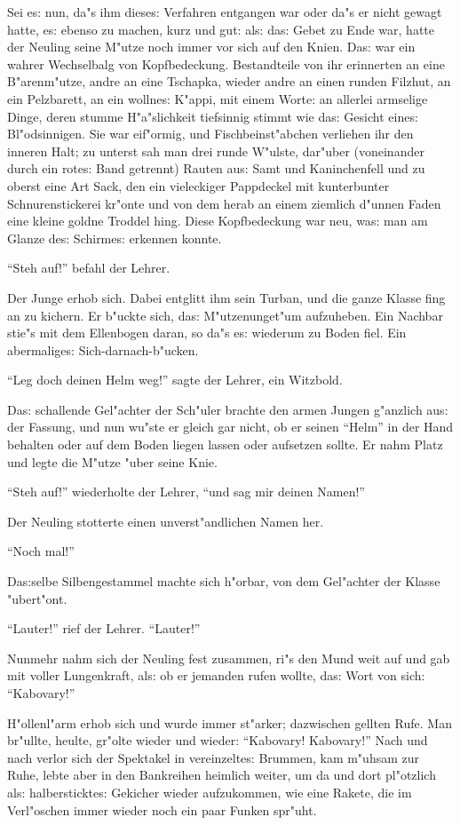 \documentclass[oneside,12pt]{book}
\newcommand{\s}{s:}%
\begin{document}
Sei e{\s} nun, da"s ihm diese{\s} Verfahren entgangen war oder
da"s er nicht gewagt hatte, e{\s} ebenso zu machen, kurz und gut:
al{\s} da{\s} Gebet zu Ende war, hatte der Neuling seine M"utze
noch immer vor sich auf den Knien. Da{\s} war ein wahrer
Wechselbalg von Kopfbedeckung. Bestandteile von ihr erinnerten an
eine B"arenm"utze, andre an eine Tschapka, wieder andre an einen
runden Filzhut, an ein Pelzbarett, an ein wollne{\s} K"appi, mit
einem Worte: an allerlei armselige Dinge, deren stumme
H"a"slichkeit tiefsinnig stimmt wie da{\s} Gesicht eine{\s}
Bl"odsinnigen. Sie war eif"ormig, und Fischbeinst"abchen verliehen
ihr den inneren Halt; zu unterst sah man drei runde W"ulste,
dar"uber (voneinander durch ein rote{\s} Band getrennt) Rauten
au{\s} Samt und Kaninchenfell und zu oberst eine Art Sack, den ein
vieleckiger Pappdeckel mit kunterbunter Schnurenstickerei kr"onte
und von dem herab an einem ziemlich d"unnen Faden eine kleine
goldne Troddel hing. Diese Kopfbedeckung war neu, wa{\s} man am
Glanze de{\s} Schirme{\s} erkennen konnte.

"`Steh auf!"' befahl der Lehrer.

Der Junge erhob sich. Dabei entglitt ihm sein Turban, und die
ganze Klasse fing an zu kichern. Er b"uckte sich, da{\s}
M"utzenunget"um aufzuheben. Ein Nachbar stie"s mit dem Ellenbogen
daran, so da"s e{\s} wiederum zu Boden fiel. Ein abermalige{\s}
Sich-darnach-b"ucken.

"`Leg doch deinen Helm weg!"' sagte der Lehrer, ein Witzbold.

Da{\s} schallende Gel"achter der Sch"uler brachte den armen Jungen
g"anzlich au{\s} der Fassung, und nun wu"ste er gleich gar nicht,
ob er seinen "`Helm"' in der Hand behalten oder auf dem Boden
liegen lassen oder aufsetzen sollte. Er nahm Platz und legte die
M"utze "uber seine Knie.

"`Steh auf!"' wiederholte der Lehrer, "`und sag mir deinen Namen!"'

Der Neuling stotterte einen unverst"andlichen Namen her.

"`Noch mal!"'

Da{\s}selbe Silbengestammel machte sich h"orbar, von dem Gel"achter
der Klasse "ubert"ont.

"`Lauter!"' rief der Lehrer. "`Lauter!"'

Nunmehr nahm sich der Neuling fest zusammen, ri"s den Mund weit
auf und gab mit voller Lungenkraft, al{\s} ob er jemanden rufen
wollte, da{\s} Wort von sich: "`Kabovary!"'

H"ollenl"arm erhob sich und wurde immer st"arker; dazwischen
gellten Rufe. Man br"ullte, heulte, gr"olte wieder und wieder:
"`Kabovary! Kabovary!"' Nach und nach verlor sich der Spektakel in
vereinzelte{\s} Brummen, kam m"uhsam zur Ruhe, lebte aber in den
Bankreihen heimlich weiter, um da und dort pl"otzlich al{\s}
halberstickte{\s} Gekicher wieder aufzukommen, wie eine Rakete,
die im Verl"oschen immer wieder noch ein paar Funken spr"uht.
\end{document}
